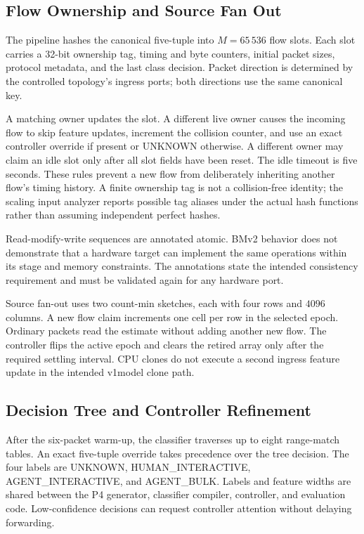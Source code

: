 \subsection{Flow Ownership and Source Fan Out}

The pipeline hashes the canonical five-tuple into $M=65\,536$ flow slots. Each slot carries
a 32-bit ownership tag, timing and byte counters, initial packet sizes, protocol metadata,
and the last class decision. Packet direction is determined by the controlled topology's
ingress ports; both directions use the same canonical key.

A matching owner updates the slot. A different live owner causes the incoming flow to
skip feature updates, increment the collision counter, and use an exact controller override
if present or UNKNOWN otherwise. A different owner may claim an idle slot only after all
slot fields have been reset. The idle timeout is five seconds. These rules prevent a new
flow from deliberately inheriting another flow's timing history. A finite ownership tag
is not a collision-free identity; the scaling input analyzer reports possible tag aliases
under the actual hash functions rather than assuming independent perfect hashes.

Read-modify-write sequences are annotated atomic. BMv2 behavior does not demonstrate that
a hardware target can implement the same operations within its stage and memory constraints.
The annotations state the intended consistency requirement and must be validated again
for any hardware port.

Source fan-out uses two count-min sketches, each with four rows and $4096$ columns. A new
flow claim increments one cell per row in the selected epoch. Ordinary packets read the
estimate without adding another new flow. The controller flips the active epoch and clears
the retired array only after the required settling interval. CPU clones do not execute a
second ingress feature update in the intended v1model clone path.

\subsection{Decision Tree and Controller Refinement}

After the six-packet warm-up, the classifier traverses up to eight range-match tables.
An exact five-tuple override takes precedence over the tree decision. The four labels are
UNKNOWN, HUMAN\_INTERACTIVE, AGENT\_INTERACTIVE, and AGENT\_BULK. Labels and feature widths
are shared between the P4 generator, classifier compiler, controller, and evaluation code.
Low-confidence decisions can request controller attention without delaying forwarding.

